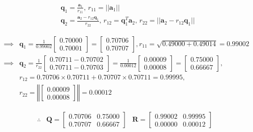 \documentclass[12pt, letterpaper]{article}
\begin{document}
\[\begin{split}
&\mathbf{q}_1 = \frac{\mathbf{a}_1}{r_{11}},\,
r_{11} = ||\mathbf{a}_1||\\
&\mathbf{q}_2 = \frac{\mathbf{a}_2 - r_{12}\mathbf{q}_1}{r_{22}},\,
r_{12} = \mathbf{q}_1^T\mathbf{a}_2,\,
r_{22} = ||\mathbf{a}_2 - r_{12}\mathbf{q}_1||
\end{split}\]

\begin{align*}
  \implies &\mathbf{q}_1
             = \frac{1}{0.99002}\begin{bmatrix} 0.70000 \\ 0.70001 \end{bmatrix}
             = \begin{bmatrix} 0.70706 \\ 0.70707 \end{bmatrix},
  r_{11} = \sqrt{0.49000 + 0.49014} = 0.99002\\
  \implies &\mathbf{q}_2 = \frac{1}{r_{22}}
             \begin{bmatrix}
               0.70711 - 0.70702\\
               0.70711 - 0.70703
             \end{bmatrix}
             = \frac{1}{0.00012}\begin{bmatrix}
               0.00009\\
               0.00008
             \end{bmatrix}
             = \begin{bmatrix}
               0.75000\\
               0.66667
             \end{bmatrix},\\
  &r_{12} = 0.70706 \times 0.70711 + 0.70707 \times 0.70711 = 0.99995,\\
  &r_{22} = \left\Vert\begin{bmatrix}
               0.00009\\
               0.00008
             \end{bmatrix}\right\Vert = 0.00012
\end{align*}

\begin{align*}
  \therefore &\mathbf{Q} = \begin{bmatrix} 
                             0.70706  & 0.75000 \\
                             0.70707  & 0.66667
                           \end{bmatrix}
             &\mathbf{R} = \begin{bmatrix} 
                             0.99002  & 0.99995 \\
                             0.00000  & 0.00012
                           \end{bmatrix}
\end{align*}
 
\end{document}
